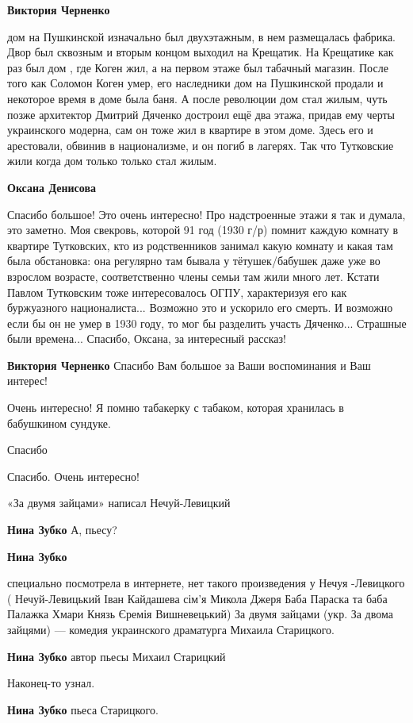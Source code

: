 \begin{itemize}
\begin{itemize} %
\textbf{Виктория Черненко} 

дом на Пушкинской изначально был двухэтажным, в нем размещалась фабрика. Двор
был сквозным и вторым концом выходил на Крещатик. На Крещатике как раз был дом
, где Коген жил, а на первом этаже был табачный магазин. После того как Соломон
Коген умер, его наследники дом на Пушкинской продали и некоторое время в доме
была баня. А после революции дом стал жилым, чуть позже архитектор Дмитрий
Дяченко достроил ещё два этажа, придав ему черты украинского модерна, сам он
тоже жил в квартире в этом доме. Здесь его и арестовали, обвинив в
национализме, и он погиб в лагерях. Так что Тутковские жили когда дом только
только стал жилым.

\begin{itemize} %
\textbf{Оксана Денисова} 

Спасибо большое! Это очень интересно! Про надстроенные этажи я так и думала,
это заметно. Моя свекровь, которой 91 год (1930 г/р) помнит каждую комнату в
квартире Тутковских, кто из родственников занимал какую комнату и какая там
была обстановка: она регулярно там бывала у тётушек/бабушек даже уже во
взрослом возрасте, соответственно члены семьи там жили много лет. Кстати Павлом
Тутковским тоже интересовалось ОГПУ, характеризуя его как буржуазного
националиста... Возможно это и ускорило его смерть. И возможно если бы он не
умер в 1930 году, то мог бы разделить участь Дяченко... Страшные были
времена... Спасибо, Оксана, за интересный рассказ!

\textbf{Виктория Черненко} Спасибо Вам большое за Ваши воспоминания и Ваш интерес!
\end{itemize} %

\end{itemize} %

Очень интересно!
Я помню табакерку с табаком, которая хранилась в бабушкином сундуке.

Спасибо

Спасибо. Очень интересно!

«За двумя зайцами» написал Нечуй-Левицкий

\begin{itemize} %
\textbf{Нина Зубко} А, пьесу?

\textbf{Нина Зубко} 

специально посмотрела в интернете, нет такого произведения у Нечуя -Левицкого (
Нечуй-Левицький Іван Кайдашева сім'я Микола Джеря Баба Параска та баба Палажка
Хмари Князь Єремія Вишневецький) За двумя зайцами (укр. За двома зайцями) —
комедия украинского драматурга Михаила Старицкого.

\textbf{Нина Зубко} автор пьесы Михаил Старицкий

Наконец-то узнал.

\textbf{Нина Зубко} пьеса Старицкого.
\end{itemize} %

\end{itemize} %
